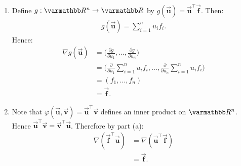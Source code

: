 \documentclass[10pt,oneside,openany]{memoir}
\begin{document}
\begin{solution}
\phantom{a}
\begin{enumerate}[label=(\alph*),itemsep=4pt,topsep=4pt]
    \item Define $g:\bfR^n\to\bfR$ by $g(\vec{\boldsymbol{u}})=\vec{\boldsymbol{u}}^{\top}\vec{\boldsymbol{f}}$. Then:
        \begin{equation*}
        \begin{split}
            g(\vec{\boldsymbol{u}})=\sum_{i=1}^n u_i f_i.
        \end{split}
        \end{equation*}
    Hence:
        \begin{equation*}
        \begin{split}
            \nabla g(\vec{\boldsymbol{u}})
            &=\biggl(\frac{\partial g}{\partial u_1},\dots,\frac{\partial g}{\partial u_n}\biggr) \\
            &=\biggl(\frac{\partial}{\partial u_1}\sum_{i=1}^n u_i f_i,\dots,\frac{\partial}{\partial u_n}\sum_{i=1}^n u_i f_i\biggr) \\
            &= (f_1,\dots,f_n) \\
            &=\vec{\boldsymbol{f}}.
        \end{split}
        \end{equation*}

    \item Note that $\varphi(\vec{\boldsymbol{u}},\vec{\boldsymbol{v}}) = \vec{\boldsymbol{u}}^{\top}\vec{\boldsymbol{v}}$ defines an inner product on $\bfR^n$. Hence $\vec{\boldsymbol{u}}^{\top}\vec{\boldsymbol{v}} = \vec{\boldsymbol{v}}^{\top}\vec{\boldsymbol{u}}$. Therefore by part (a):
        \begin{equation*}
        \begin{split}
            \nabla(\vec{\boldsymbol{f}}^{\top}\vec{\boldsymbol{u}})
            &=\nabla(\vec{\boldsymbol{u}}^{\top}\vec{\boldsymbol{f}}) \\
            &=\vec{\boldsymbol{f}}.
        \end{split}
        \end{equation*}


\end{enumerate}
\end{solution}
\end{document}
